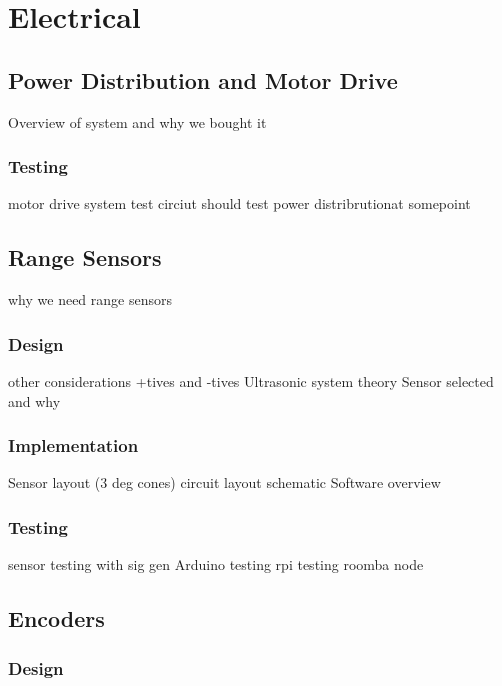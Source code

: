 
\chapter{Electrical}\label{electrical}

\section{Power Distribution and Motor Drive}
Overview of system and why we bought it
\subsection{Testing}\label{elec/range/test}
motor drive system test circiut
should test power distribrutionat somepoint 


\section{Range Sensors}\label{elec/range}
why we need range sensors 

\subsection{Design}\label{elec/range/design}
other considerations +tives and -tives
Ultrasonic system theory
Sensor selected and why

\subsection{Implementation}\label{elec/range/impl}
Sensor layout (3 deg cones) 
circuit layout
schematic
Software overview 

\subsection{Testing}\label{elec/range/test}
sensor testing with sig gen
Arduino testing
rpi testing roomba node




\section{Encoders}\label{elec/encoder}

\subsection{Design}\label{elec/encoder/design}

